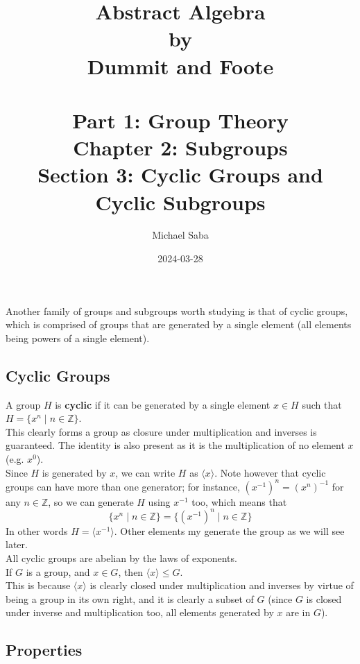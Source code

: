 \documentclass[12pt]{article}
\title{%
    \Huge Abstract Algebra \\
    \large by \\
    \Large Dummit and Foote \\~\\
    \huge Part 1: Group Theory \\
    \LARGE Chapter 2: Subgroups \\
    \Large Section 3: Cyclic Groups and Cyclic Subgroups
}
\date{2024-03-28}
\author{Michael Saba}
\newcommand{\Z}{\mathbb{Z}}
\newcommand{\ang}[1]{\langle #1 \rangle}
\begin{document}
    \maketitle
    \newpage

   
    Another family of groups and subgroups worth studying
    is that of cyclic groups,
    which is comprised of groups that are generated
    by a single element
    (all elements being powers of a single element). \\


    \subsection*{Cyclic Groups}

    A group $H$ is \textbf{cyclic}
    if it can be generated by a single element 
    $x \in H$ such that $H = \{ x^n \mid n \in \Z \}$. \\
    This clearly forms a group as closure under multiplication
    and inverses is guaranteed.
    The identity is also present as it is the multiplication of
    no element $x$ (e.g. $x^0$). \\
    Since $H$ is generated by $x$,
    we can write $H$ as $\ang{x}$.
    Note however that cyclic groups can have more than one generator;
    for instance, $(x^{-1})^n = (x^n)^{-1}$ for any $n \in \Z$,
    so we can generate $H$ using $x^{-1}$ too,
    which means that
    \[ \{ x^n \mid n \in \Z \} = \{ (x^{-1})^n \mid n \in \Z \} \]
    In other words $H = \ang{x^{-1}}$.
    Other elements my generate the group as we will see later. \\

    All cyclic groups are abelian by the laws of exponents. \\

    If $G$ is a group, and $x \in G$,
    then $\ang{x} \leqslant G$. \\
    This is because $\ang{x}$ is clearly closed under
    multiplication and inverses
    by virtue of being a group in its own right,
    and it is clearly a subset of $G$
    (since $G$ is closed under inverse and multiplication too,
    all elements generated by $x$ are in $G$). \\

    \subsection*{Properties}
\end{document}
